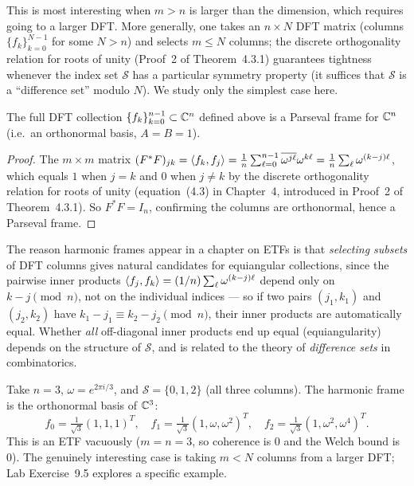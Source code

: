 \begin{remark*}
This is most interesting when $m>n$ is larger than the dimension, which
requires going to a larger DFT. More generally, one takes an $n\times N$
DFT matrix (columns $\{f_k\}_{k=0}^{N-1}$ for some $N>n$) and selects
$m\le N$ columns; the discrete orthogonality relation for roots of unity
(Proof~2 of Theorem~4.3.1) guarantees tightness whenever the index set
$\mathcal S$ has a particular symmetry property (it suffices that
$\mathcal S$ is a ``difference set'' modulo $N$). We study only the
simplest case here.
\end{remark*}

\begin{proposition}
\label{prop:harmonic-tight}
The full DFT collection $\{f_k\}_{k=0}^{n-1}\subset\mathbb{C}^n$ defined above
is a Parseval frame for $\mathbb{C}^n$ (i.e.\ an orthonormal basis, $A=B=1$).
\end{proposition}

\begin{proof}
The $m\times m$ matrix $(F^*F)_{jk}=\left\langle f_k, f_j \right\rangle=\frac1n\sum_{\ell=0}^{n-1}
\overline{\omega^{j\ell}}\omega^{k\ell}=\frac1n\sum_{\ell}\omega^{(k-j)\ell}$,
which equals $1$ when $j=k$ and $0$ when $j\ne k$ by the discrete
orthogonality relation for roots of unity (equation~(4.3) in Chapter~4,
introduced in Proof~2 of Theorem~4.3.1). So $F^*F=I_n$, confirming
the columns are orthonormal, hence a Parseval frame.
\end{proof}

The reason harmonic frames appear in a chapter on ETFs is that
\emph{selecting subsets} of DFT columns gives natural candidates for
equiangular collections, since the pairwise inner products
$\left\langle f_j, f_k \right\rangle=(1/n)\sum_\ell\omega^{(k-j)\ell}$ depend only on
$k-j\pmod{n}$, not on the individual indices --- so if two pairs $(j_1,k_1)$
and $(j_2,k_2)$ have $k_1-j_1\equiv k_2-j_2\pmod n$, their inner products
are automatically equal. Whether \emph{all} off-diagonal inner products
end up equal (equiangularity) depends on the structure of $\mathcal S$,
and is related to the theory of \emph{difference sets} in combinatorics.

\begin{examplebox}[title={Example 9.4: A harmonic frame in $\C^3$}]
\label{ex:harmonic-c3}
Take $n=3$, $\omega=e^{2\pi i/3}$, and $\mathcal S=\{0,1,2\}$ (all three
columns). The harmonic frame is the orthonormal basis of $\C^3$:
\[
  f_0 = \tfrac{1}{\sqrt3}(1,1,1)^T,\quad
  f_1 = \tfrac{1}{\sqrt3}(1,\omega,\omega^2)^T,\quad
  f_2 = \tfrac{1}{\sqrt3}(1,\omega^2,\omega^4)^T.
\]
This is an ETF vacuously ($m=n=3$, so coherence is $0$ and the Welch
bound is $0$). The genuinely interesting case is taking $m<N$ columns
from a larger DFT; Lab Exercise~9.5 explores a specific example.
\end{examplebox}

